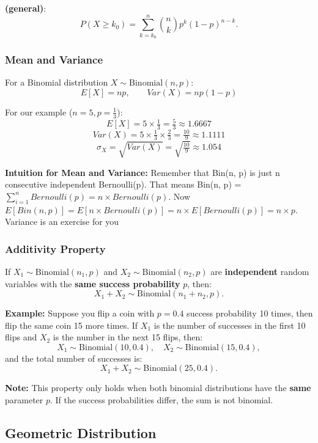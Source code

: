 \documentclass[12pt]{article}
\begin{document}
\textbf{(general)}:
\[
P(X\ge k_0)=\sum_{k=k_0}^{n}\binom{n}{k}p^k(1-p)^{n-k}.
\]

\subsubsection{
    Mean and Variance
}
For a Binomial distribution \(X \sim \mathrm{Binomial}(n, p)\):
\[
E[X] = n p, \qquad Var(X) = n p (1 - p)
\]

For our example (\(n = 5, p = \tfrac{1}{3}\)):
\[
E[X] = 5 \times \tfrac{1}{3} = \tfrac{5}{3} \approx 1.6667
\]
\[
Var(X) = 5 \times \tfrac{1}{3} \times \tfrac{2}{3} = \tfrac{10}{9} \approx 1.1111
\]
\[
\sigma_X = \sqrt{Var(X)} = \sqrt{\tfrac{10}{9}} \approx 1.054
\]

\textbf{Intuition for Mean and Variance:} Remember that Bin(n, p) is just n consecutive independent Bernoulli(p). That means Bin(n, p) = $ \sum_{i=1}^{n} Bernoulli(p) = n \times Bernoulli(p)$. Now $E[Bin(n, p)] = E[n \times Bernoulli(p)] = n \times E[Bernoulli(p)] = n \times p$.\newline
Variance is an exercise for you\newline

\subsubsection{
    Additivity Property
}

If \(X_1 \sim \mathrm{Binomial}(n_1, p)\) and \(X_2 \sim \mathrm{Binomial}(n_2, p)\) are \textbf{independent} random variables with the \textbf{same success probability} \(p\), then:
\[
X_1 + X_2 \sim \mathrm{Binomial}(n_1 + n_2, p).
\]

\textbf{Example:} Suppose you flip a coin with \(p=0.4\) success probability 10 times, then flip the same coin 15 more times. If \(X_1\) is the number of successes in the first 10 flips and \(X_2\) is the number in the next 15 flips, then:
\[
X_1 \sim \mathrm{Binomial}(10, 0.4), \quad X_2 \sim \mathrm{Binomial}(15, 0.4),
\]
and the total number of successes is:
\[
X_1 + X_2 \sim \mathrm{Binomial}(25, 0.4).
\]

\textbf{Note:} This property only holds when both binomial distributions have the \textbf{same} parameter \(p\). If the success probabilities differ, the sum is not binomial.


\subsection{Geometric Distribution}
\end{document}
